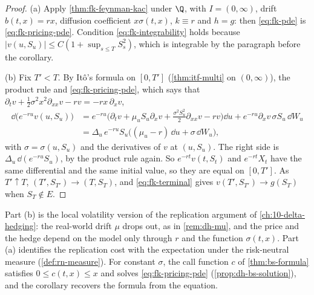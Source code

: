 \begin{proof}
(a) Apply \cref{thm:fk-feynman-kac} under $\Q$, with $I=(0,\infty)$, drift $b(t,x)=rx$, diffusion
coefficient $x\sigma(t,x)$, $k\equiv r$ and $h=g$: then \eqref{eq:fk-pde} is \eqref{eq:fk-pricing-pde}.
Condition \eqref{eq:fk-integrability} holds because $|v(u,S_u)|\le C(1+\sup_{s\le T}S_s^2)$, which is
integrable by the paragraph before the corollary.

(b) Fix $T'<T$. By It\^o's formula on $[0,T']$ (\cref{thm:itf-multi} on $(0,\infty)$), the product
rule and \eqref{eq:fk-pricing-pde}, which says that
$\partial_tv+\frac12\sigma^2x^2\partial_{xx}v-rv=-rx\,\partial_xv$,
\begin{align*}
  \dd\big(e^{-ru}v(u,S_u)\big)
  &=e^{-ru}\Big(\partial_tv+\mu_uS_u\partial_xv+\frac{\sigma^2S_u^2}{2}\partial_{xx}v-rv\Big)\dd u
   +e^{-ru}\partial_xv\,\sigma S_u\,\dd W_u\\
  &=\Delta_u\,e^{-ru}S_u\big((\mu_u-r)\,\dd u+\sigma\,\dd W_u\big),
\end{align*}
with $\sigma=\sigma(u,S_u)$ and the derivatives of $v$ at $(u,S_u)$. The right side is
$\Delta_u\,\dd(e^{-ru}S_u)$, by the product rule again. So $e^{-rt}v(t,S_t)$ and $e^{-rt}X_t$ have
the same differential and the same initial value, so they are equal on $[0,T']$. As
$T'\uparrow T$, $(T',S_{T'})\to(T,S_T)$, and \eqref{eq:fk-terminal} gives $v(T',S_{T'})\to g(S_T)$
when $S_T\notin E$.
\end{proof}

Part (b) is the local volatility version of the replication argument of
\cref{ch:10-delta-hedging}: the real-world drift $\mu$ drops out, as in \cref{rem:dh-mu}, and
the price and the hedge depend on the model only through $r$ and the function $\sigma(t,x)$.
Part (a) identifies the replication cost with the expectation under the risk-neutral measure
(\cref{def:rn-measure}). For constant $\sigma$, the call
function $c$ of \cref{thm:bs-formula} satisfies $0\le c(t,x)\le x$ and solves
\eqref{eq:fk-pricing-pde} (\cref{prop:dh-bs-solution}), and the corollary recovers the formula
from the equation.

